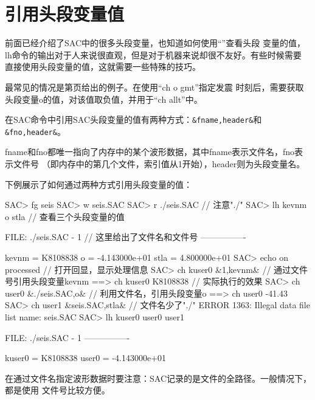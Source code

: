 \section{引用头段变量值}
前面已经介绍了SAC中的很多头段变量，也知道如何使用``''查看头段
变量的值，lh命令的输出对于人来说很直观，但是对于机器来说却很不友好。有些时候需要
直接使用头段变量的值，这就需要一些特殊的技巧。

最常见的情况是第\pageref{code:origin-time}页给出的例子。在使用``ch o gmt''指定发震
时刻后，需要获取头段变量o的值，对该值取负值，并用于``ch allt''中。

在SAC命令中引用SAC头段变量的值有两种方式：\lstinline{&fname,header&}和\lstinline{&fno,header&}。

fname和fno都唯一指向了内存中的某个波形数据，其中fname表示文件名，fno表示文件号
（即内存中的第几个文件，索引值从1开始），header则为头段变量名。

下例展示了如何通过两种方式引用头段变量的值：
\begin{SACCode}
SAC> fg seis
SAC> w seis.SAC 
SAC> r ./seis.SAC               // 注意"./"
SAC> lh kevnm o stla            // 查看三个头段变量的值
  
  FILE: ./seis.SAC - 1          // 这里给出了文件名和文件号
 ----------------

     kevnm = K8108838
         o = -4.143000e+01
      stla = 4.800000e+01
SAC> echo on processed          // 打开回显，显示处理信息
SAC> ch kuser0 &1,kevnm&        // 通过文件号引用头段变量kevnm    
 ==>  ch kuser0 K8108838        // 实际执行的效果
SAC> ch user0 &./seis.SAC,o&    // 利用文件名，引用头段变量o
 ==>  ch user0 -41.43       
SAC> ch user1 &seis.SAC,stla&   // 文件名少了"./"
 ERROR 1363: Illegal data file list name: seis.SAC
SAC> lh kuser0 user0 user1
  
  FILE: ./seis.SAC - 1
   ----------------

     kuser0 = K8108838
     user0 = -4.143000e+01
\end{SACCode}

在通过文件名指定波形数据时要注意：SAC记录的是文件的全路径。一般情况下，都是使用
文件号比较方便。
